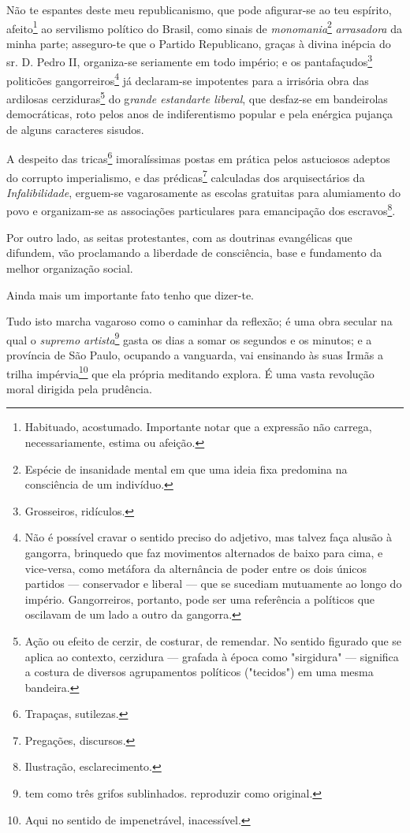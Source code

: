 Não te espantes deste meu republicanismo, que pode afigurar-se ao teu
espírito, afeito\footnote{Habituado, acostumado. Importante notar que
  a expressão não carrega, necessariamente, estima ou afeição.} ao
servilismo político do Brasil, como sinais de \emph{monomania}\footnote{
  Espécie de insanidade mental em que uma ideia fixa predomina na
  consciência de um indivíduo.} \emph{arrasadora} da minha parte;
asseguro-te que o Partido Republicano, graças à divina inépcia do sr. D.
Pedro II, organiza-se seriamente em todo império; e os
pantafaçudos\footnote{Grosseiros, ridículos.} politicões
gangorreiros\footnote{Não é possível cravar o sentido preciso do
  adjetivo, mas talvez faça alusão à gangorra, brinquedo que faz
  movimentos alternados de baixo para cima, e vice-versa, como metáfora
  da alternância de poder entre os dois únicos partidos --- conservador
  e liberal --- que se sucediam mutuamente ao longo do império.
  Gangorreiros, portanto, pode ser uma referência a políticos que
  oscilavam de um lado a outro da gangorra.} já declaram-se impotentes
para a irrisória obra das ardilosas cerziduras\footnote{Ação ou efeito
  de cerzir, de costurar, de remendar. No sentido figurado que se aplica
  ao contexto, cerzidura --- grafada à época como "sirgidura" ---
  significa a costura de diversos agrupamentos políticos ("tecidos") em
  uma mesma bandeira.} do g\emph{rande estandarte liberal}, que
desfaz-se em bandeirolas democráticas, roto pelos anos de indiferentismo
popular e pela enérgica pujança de alguns caracteres sisudos.

A despeito das tricas\footnote{Trapaças, sutilezas.} imoralíssimas
postas em prática pelos astuciosos adeptos do corrupto imperialismo, e
das prédicas\footnote{Pregações, discursos.} calculadas dos
arquisectários da \emph{Infalibilidade}, erguem-se vagarosamente as
escolas gratuitas para alumiamento do povo e organizam-se as associações
particulares para emancipação dos escravos\footnote{Ilustração,
  esclarecimento.}.

Por outro lado, as seitas protestantes, com as doutrinas evangélicas que
difundem, vão proclamando a liberdade de consciência, base e fundamento
da melhor organização social.

Ainda mais um importante fato tenho que dizer-te.

Tudo isto marcha vagaroso como o caminhar da reflexão; é uma obra
secular na qual o \emph{supremo artista}\footnote{tem como três grifos
  sublinhados. reproduzir como original.} gasta os dias a somar os
segundos e os minutos; e a província de São Paulo, ocupando a vanguarda,
vai ensinando às suas Irmãs a trilha impérvia\footnote{Aqui no sentido
  de impenetrável, inacessível.} que ela própria meditando explora. É
uma vasta revolução moral dirigida pela prudência.

